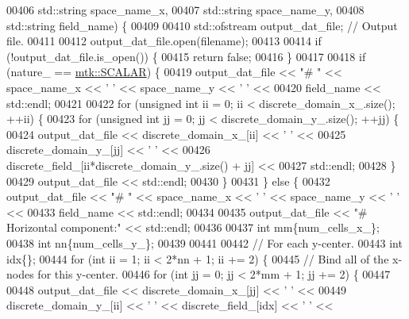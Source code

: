 \begin{DoxyCode}
00406                                     std::string space\_name\_x,
00407                                     std::string space\_name\_y,
00408                                     std::string field\_name) \{
00409 
00410   std::ofstream output\_dat\_file;  \textcolor{comment}{// Output file.}
00411 
00412   output\_dat\_file.open(filename);
00413 
00414   \textcolor{keywordflow}{if} (!output\_dat\_file.is\_open()) \{
00415     \textcolor{keywordflow}{return} \textcolor{keyword}{false};
00416   \}
00417 
00418   \textcolor{keywordflow}{if} (nature\_ == \hyperlink{namespacemtk_ga4c54f2a329cfb4e56213b02a259d19e2af481d45bd70d41381c7d72e200889205}{mtk::SCALAR}) \{
00419     output\_dat\_file << \textcolor{stringliteral}{"# "} << space\_name\_x <<  \textcolor{charliteral}{' '} << space\_name\_y << \textcolor{charliteral}{' '} <<
00420       field\_name << std::endl;
00421 
00422     \textcolor{keywordflow}{for} (\textcolor{keywordtype}{unsigned} \textcolor{keywordtype}{int} ii = 0; ii < discrete\_domain\_x\_.size(); ++ii) \{
00423       \textcolor{keywordflow}{for} (\textcolor{keywordtype}{unsigned} \textcolor{keywordtype}{int} jj = 0; jj < discrete\_domain\_y\_.size(); ++jj) \{
00424         output\_dat\_file << discrete\_domain\_x\_[ii] << \textcolor{charliteral}{' '} <<
00425                            discrete\_domain\_y\_[jj] << \textcolor{charliteral}{' '} <<
00426                            discrete\_field\_[ii*discrete\_domain\_y\_.size() + jj] <<
00427                           std::endl;
00428       \}
00429       output\_dat\_file << std::endl;
00430     \}
00431   \} \textcolor{keywordflow}{else} \{
00432     output\_dat\_file << \textcolor{stringliteral}{"# "} << space\_name\_x <<  \textcolor{charliteral}{' '} << space\_name\_y << \textcolor{charliteral}{' '} <<
00433       field\_name << std::endl;
00434 
00435     output\_dat\_file << \textcolor{stringliteral}{"# Horizontal component:"} << std::endl;
00436 
00437     \textcolor{keywordtype}{int} mm\{num\_cells\_x\_\};
00438     \textcolor{keywordtype}{int} nn\{num\_cells\_y\_\};
00439 
00441 
00442     \textcolor{comment}{// For each y-center.}
00443     \textcolor{keywordtype}{int} idx\{\};
00444     \textcolor{keywordflow}{for} (\textcolor{keywordtype}{int} ii = 1; ii < 2*nn + 1; ii += 2) \{
00445       \textcolor{comment}{// Bind all of the x-nodes for this y-center.}
00446       \textcolor{keywordflow}{for} (\textcolor{keywordtype}{int} jj = 0; jj < 2*mm + 1; jj += 2) \{
00447 
00448         output\_dat\_file << discrete\_domain\_x\_[jj] << \textcolor{charliteral}{' '} <<
00449           discrete\_domain\_y\_[ii] << \textcolor{charliteral}{' '} << discrete\_field\_[idx] << \textcolor{charliteral}{' '} <<

\end{DoxyCode}
